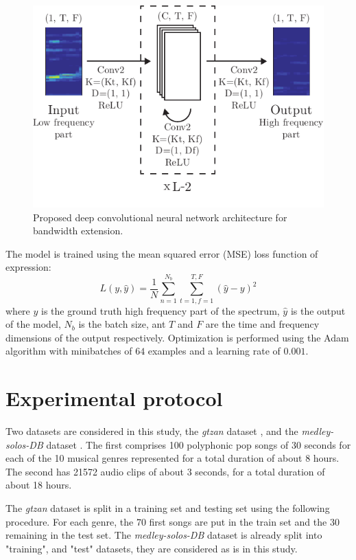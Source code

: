 \documentclass{article}
\begin{document}
\begin{figure}[t]
    \centering
    \includegraphics[width=\columnwidth]{figures/mdl.pdf}
    \caption{Proposed deep convolutional neural network architecture for bandwidth extension.}\label{fig:mdl}
\end{figure}

The model is trained using the mean squared error (MSE) loss function of expression:
\begin{equation}
L(y, \hat y) = \frac{1}{N}\sum\limits_{n=1}^{N_b}\sum\limits_{t=1, f=1}^{T, F}(\hat y - y)^2
\end{equation}
where $y$ is the ground truth high frequency part of the spectrum, $\hat y$ is the output of the model, $N_b$ is the batch size, ant $T$ and $F$ are the time and frequency dimensions of the output respectively. Optimization is performed using the Adam \cite{kingma2014adam} algorithm with minibatches of $64$ examples and a learning rate of $0.001$.


\section{Experimental protocol}
\label{sec:protocol}

Two datasets are considered in this study, the \textit{gtzan} dataset \cite{tzanetakis2002musical}, and the \textit{medley-solos-DB} dataset \cite{lostanlen2016deep}. The first comprises 100 polyphonic pop songs of 30 seconds for each of the 10 musical genres represented for a total duration of about 8 hours. The second has 21572 audio clips of about 3 seconds, for a total duration of about 18 hours.

The \textit{gtzan} dataset is split in a training set and testing set using the following procedure. For each genre, the 70 first songs are put in the train set and the 30 remaining in the test set. The \textit{medley-solos-DB} dataset is already split into "training", and "test" datasets, they are considered as is in this study.
\end{document}
